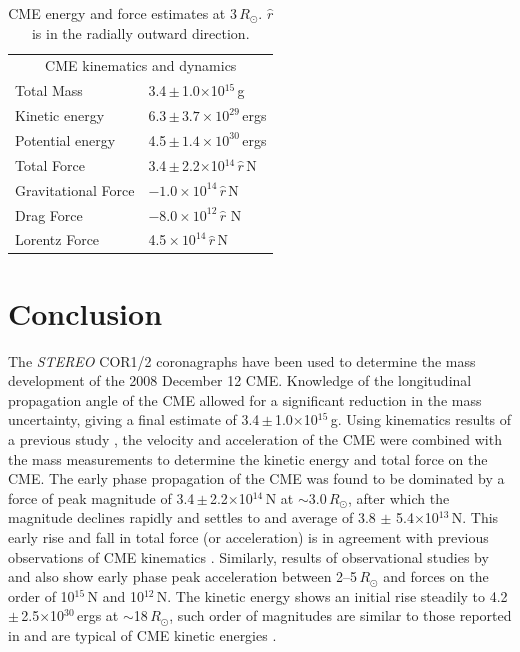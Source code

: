 \begin{table}[!t]
  \centering
\begin{tabular}{ll}
\hline
\hline
\multicolumn{2}{c}{CME kinematics and dynamics} \\
\cline{1-2}
Total Mass & 3.4\,$\pm$\,1.0$\times$10$^{15}$\,g \\
Kinetic energy & 6.3\,$\pm\,3.7\times10^{29}$\,ergs \\
Potential energy & 4.5\,$\pm\,1.4\times10^{30}$\,ergs \\
Total Force & 3.4\,$\pm$\,2.2$\times$10$^{14}\,\hat{r}$\,N \\
Gravitational Force & $-1.0\times10^{14}\,\hat{r}$\,N \\
Drag Force & $-8.0\times10^{12}\,\hat{r}\,$\,N \\
Lorentz Force & 4.5\,$\times\,10^{14}\,\hat{r}$\,N \\
\hline
\hline

\end{tabular}

\caption {{\color{black}CME energy and force estimates at 3\,$R_{\odot}$. $\hat{r}$ is in the radially outward direction.}}
\label{tab:cmekins}
\end{table}


 \section{Conclusion} \label{bozomath}
 The \emph{STEREO} COR1/2 coronagraphs have been used to determine the mass development of the 2008 December 12 CME. Knowledge of the longitudinal propagation angle of the CME allowed for a significant reduction in the mass uncertainty, giving a final estimate of 3.4\,$\pm$\,1.0$\times$10$^{15}$\,g. Using kinematics results of a previous study \citep{byrne2010}, the velocity and acceleration of the CME were combined with the mass measurements to determine the kinetic energy and total force on the CME. The early phase propagation of the CME was found to be dominated by a force of peak magnitude of 3.4\,$\pm$\,2.2$\times$10$^{14}$\,N at $\sim$3.0\,$R_{\odot}$, after which the magnitude declines 
rapidly and settles to and average of 3.8 $\pm$ 5.4$\times$10$^{13}$\,N. This early rise and fall in total force (or acceleration) is in agreement with previous observations of CME kinematics \citep{gallagher03, bein2011}. Similarly, results of observational studies by \citet{zhang2001} and \citet{zhang2004} also show early phase peak acceleration between 2--5\,$R_{\odot}$ and forces on the order of 10$^{15}$\,N and 10$^{12}$\,N. The kinetic energy shows an initial rise steadily to 4.2\,$\pm$\,2.5$\times$10$^{30}$\,ergs at $\sim$18\,$R_{\odot}$, such order of magnitudes are similar to those reported in \citet{vou00,emslie2004} and are typical of CME kinetic energies \citep{vour2010}.

